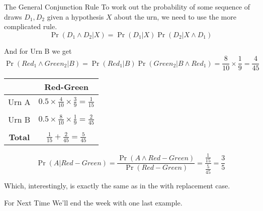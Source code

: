 \documentclass[
  ignorenonframetext,
]{beamer}
\renewcommand{\,}{\text{, }}
\begin{document}
\begin{frame}{The General Conjunction Rule}
\protect\hypertarget{the-general-conjunction-rule-1}{}
To work out the probability of some sequence of draws \(D_1, D_2\) given
a hypothesis \(X\) about the urn, we need to use the more complicated
rule. \[
\Pr(D_1 \wedge D_2 | X) = \Pr(D_1 | X) \Pr(D_2 | X \wedge D_1)
\]

And for Urn B we get \[
\Pr(Red_1 \wedge Green_2 | B) = \Pr(Red_1 | B)\Pr(Green_2 | B \wedge Red_1) = \frac{8}{10} \times \frac{1}{9} = \frac{4}{45}
\]
\end{frame}

\begin{frame}
\begin{longtable}[]{@{}cc@{}}
\toprule
& Red-Green \\
\midrule
\endhead
Urn A & \(0.5 \times \frac{4}{10} \times \frac{3}{9} = \frac{1}{15}\) \\
& \\
Urn B & \(0.5 \times \frac{8}{10} \times \frac{1}{9} = \frac{2}{45}\) \\
& \\
\textbf{Total} & \(\frac{1}{15} + \frac{2}{45} = \frac{5}{45}\) \\
\bottomrule
\end{longtable}

\pause

\[
\Pr(A | Red-Green) = \frac{\Pr(A \wedge Red-Green)}{\Pr(Red-Green)} = \frac{\frac{1}{15}}{\frac{5}{45}} = \frac{3}{5}
\]

\bigskip

Which, interestingly, is exactly the same as in the with replacement
case.
\end{frame}

\begin{frame}{For Next Time}
\protect\hypertarget{for-next-time}{}
We'll end the week with one last example.
\end{frame}
\end{document}
